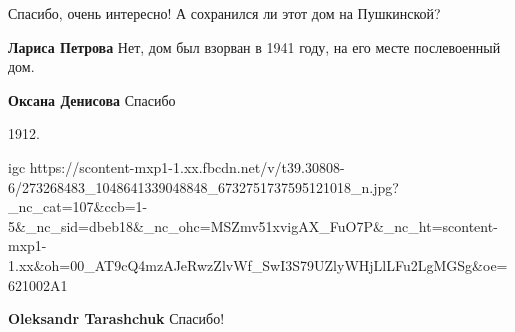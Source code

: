  
 
 
 
 

Спасибо, очень интересно! А сохранился ли этот дом на Пушкинской?

\textbf{Лариса Петрова} Нет, дом был взорван в 1941 году, на его месте послевоенный дом.

\textbf{Оксана Денисова} Спасибо

1912.

\ifcmt
  igc https://scontent-mxp1-1.xx.fbcdn.net/v/t39.30808-6/273268483_1048641339048848_6732751737595121018_n.jpg?_nc_cat=107&ccb=1-5&_nc_sid=dbeb18&_nc_ohc=MSZmv51xvigAX_FuO7P&_nc_ht=scontent-mxp1-1.xx&oh=00_AT9cQ4mzAJeRwzZlvWf_SwI3S79UZlyWHjLlLFu2LgMGSg&oe=621002A1
\fi

\textbf{Oleksandr Tarashchuk} Спасибо!
